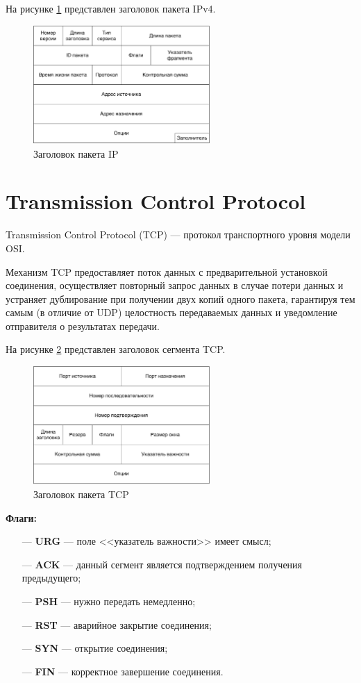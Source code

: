 \documentclass{bmstu}
\begin{document}
На рисунке \ref{img:ip_header} представлен заголовок пакета IPv4.
\begin{figure}[hbtp]
 \centering
 \includegraphics[width=0.6\textwidth]{inc/img/ip_header.pdf}
 \caption{Заголовок пакета IP}
 \label{img:ip_header}
\end{figure}

\section*{Transmission Control Protocol}
Transmission Control Protocol (TCP) --- протокол транспортного уровня модели OSI.

Механизм TCP предоставляет поток данных с предварительной установкой соединения, осуществляет повторный запрос данных в случае потери данных и устраняет дублирование при получении двух копий одного пакета, гарантируя тем самым (в отличие от UDP) целостность передаваемых данных и уведомление отправителя о результатах передачи.

На рисунке \ref{img:tcp_header} представлен заголовок сегмента TCP.
\begin{figure}[hbtp]
 \centering
 \includegraphics[width=0.6\textwidth]{inc/img/tcp_header.pdf}
 \caption{Заголовок пакета TCP}
 \label{img:tcp_header}
\end{figure}

\textbf{Флаги:}
\begin{itemize}
    \item[---] \textbf{URG} --- поле <<указатель важности>> имеет смысл;
    \item[---] \textbf{ACK} --- данный сегмент является подтверждением получения предыдущего;
    \item[---] \textbf{PSH} --- нужно передать немедленно;
    \item[---] \textbf{RST} --- аварийное закрытие соединения;
    \item[---] \textbf{SYN} --- открытие соединения;
    \item[---] \textbf{FIN} --- корректное завершение соединения.
\end{itemize}
\end{document}
